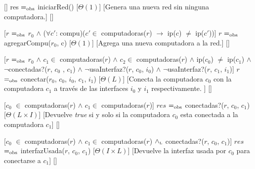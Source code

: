 \begin{Interfaz}
  


  

  [] %
  {res $=_{\mathrm{obs}}$ iniciarRed()} %
  [$\Theta(1)$] %
  [Genera una nueva red sin ninguna computadora.] %
  [] %
  
  [$r$ $=_{\mathrm{obs}}$ $r_{0}$ $\land$ ($\forall c'$: compu)($c' \in$ computadoras($r$) $\rightarrow$ ip($c$) $\neq$ ip($c'$))] %
  {$r$ $=_{\mathrm{obs}}$ agregarCompu($r_{0}$, c)} %
  [$\Theta(1)$] %
  [Agrega una nueva computadora a la red.] %
  [] %

  [$r$ $=_{\mathrm{obs}}$ $r_{0}$ $\land$ $c_{1} \in$ computadoras($r$) $\land$ $c_{2} \in$ computadoras($r$) $\land$ ip($c_{0} $) $\neq$ ip($c_{1}$) $\land$ $\lnot$conectadas?($r$, $c_{0}$ , $c_{1} $) $\land$ $\lnot$usaInterfaz?($r$, $c_{0}$, $i_{0}$) $\land$ $\lnot$usaInterfaz?($r$, $c_{1}$, $i_{1}$)] %
  {$r$ $=_{\mathrm{obs}}$ conectar($r_{0}$, $c_{0}$, $i_{0}$, $c_{1}$, $i_{1}$)} %
  [$\Theta(L)$] %
  [Conecta la computadora $c_{0}$ con la computadora $c_{1}$ a trav\'es de las interfaces $i_{0}$ y $i_{1}$ respectivamente. ] %
  [] %
  
  [$c_{0}$ $\in$ computadoras($r$) $\land$ $c_{1} \in $ computadoras($r$)] %
  {$res$ $=_{\mathrm{obs}}$ conectadas?($r$, $c_{0}$, $c_{1}$)} %
  [$\Theta(L \times I)$] %
  [Devuelve \emph{true} si y solo si la computadora $c_{0}$ esta conectada a la computadora $c_{1}$] %
  [] %
  
  [$c_{0}$ $\in$ computadoras($r$) $\land$ $c_{1} \in $ computadoras($r$) $\land_{\mathrm{\scriptscriptstyle{L}}}$ conectadas?($r$, $c_{0}$, $c_{1}$)] %
  {$res$ $=_{\mathrm{obs}}$ interfazUsada($r$, $c_{0}$, $c_{1}$)} %
  [$\Theta(I \times L)$] %
  [Devuelve la interfaz usada por $c_{0}$ para conectarse a $c_{1}$] %
  [] %
  

\end{Interfaz}
